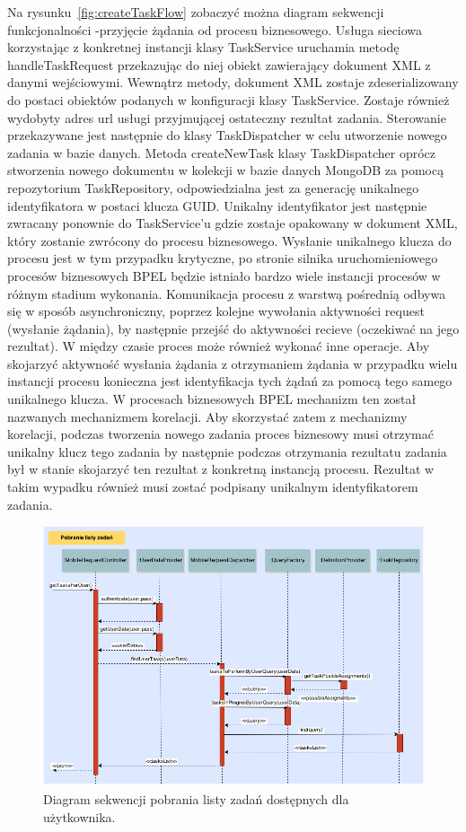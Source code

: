 Na rysunku~\ref{fig:createTaskFlow} zobaczyć można diagram sekwencji funkcjonalności -przyjęcie żądania od procesu biznesowego. Usługa sieciowa korzystając z konkretnej instancji klasy TaskService uruchamia metodę handleTaskRequest przekazując do niej obiekt zawierający dokument XML z danymi wejściowymi. Wewnątrz metody, dokument XML zostaje zdeserializowany do postaci obiektów podanych w konfiguracji klasy TaskService. Zostaje również wydobyty adres url usługi przyjmującej ostateczny rezultat zadania. Sterowanie przekazywane jest następnie do klasy TaskDispatcher w celu utworzenie nowego zadania w bazie danych. Metoda createNewTask klasy TaskDispatcher oprócz stworzenia nowego dokumentu w kolekcji w bazie danych MongoDB za pomocą repozytorium TaskRepository, odpowiedzialna jest za generację unikalnego identyfikatora w postaci klucza GUID. Unikalny identyfikator jest następnie zwracany ponownie do TaskService'u gdzie zostaje opakowany w dokument XML, który zostanie zwrócony do procesu biznesowego. Wysłanie unikalnego klucza do procesu jest w tym przypadku krytyczne, po stronie silnika uruchomieniowego procesów biznesowych BPEL będzie istniało bardzo wiele instancji procesów w różnym stadium wykonania. Komunikacja procesu z warstwą pośrednią odbywa się w sposób asynchroniczny, poprzez kolejne wywołania aktywności request (wysłanie żądania), by następnie przejść do aktywności recieve (oczekiwać na jego rezultat). W między czasie proces może również wykonać inne operacje. Aby skojarzyć aktywność wysłania żądania z otrzymaniem żądania w przypadku wielu instancji procesu konieczna jest identyfikacja tych żądań za pomocą tego samego unikalnego klucza. W procesach biznesowych BPEL mechanizm ten został nazwanych mechanizmem korelacji.  Aby skorzystać zatem z mechanizmy korelacji, podczas tworzenia nowego zadania proces biznesowy musi otrzymać unikalny klucz tego zadania by następnie podczas otrzymania rezultatu zadania był w stanie skojarzyć ten rezultat z konkretną instancją procesu. Rezultat w takim wypadku również musi zostać podpisany unikalnym identyfikatorem zadania. 

\begin{figure}[h]
\centerline{\includegraphics[scale=0.5]{tasksListFlow}}
\caption{Diagram sekwencji pobrania listy zadań dostępnych dla użytkownika.}
\label{fig:tasksListFlow}
\end{figure}

